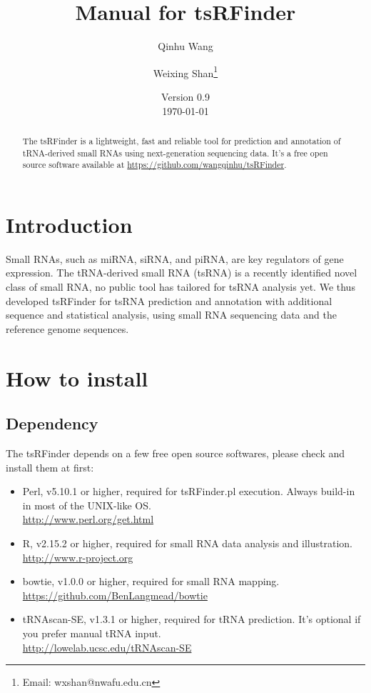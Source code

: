\documentclass[11pt, a4paper]{article}
\title{Manual for tsRFinder}
\author{Qinhu Wang}
\author{Weixing Shan\thanks{Email: wxshan@nwafu.edu.cn}}
\affil{Northwest A\&F University}
\date{Version 0.9\\[3pt] \today}
\begin{document}
\maketitle

\begin{abstract}
The tsRFinder is a lightweight, fast and reliable tool for prediction and annotation of tRNA-derived small RNAs using next-generation sequencing data. It's a free open source software available at \url{https://github.com/wangqinhu/tsRFinder}.
\end{abstract}

\clearpage

\tableofcontents

\clearpage

\section{Introduction}

Small RNAs, such as miRNA, siRNA, and piRNA, are key regulators of gene expression. The tRNA-derived small RNA (tsRNA) is a recently identified novel class of small RNA, no public tool has tailored for tsRNA analysis yet. We thus developed tsRFinder for tsRNA prediction and annotation with additional sequence and statistical analysis, using small RNA sequencing data and the reference genome sequences.

\section{How to install}

\subsection{Dependency}

The tsRFinder depends on a few free open source softwares, please check and install them at first:

\begin{itemize}

\item Perl, v5.10.1 or higher, required for tsRFinder.pl execution. Always build-in in most of the UNIX-like OS. \\\url{http://www.perl.org/get.html}
\item R, v2.15.2 or higher, required for small RNA data analysis and illustration. \\\url{http://www.r-project.org}
\item bowtie, v1.0.0 or higher, required for small RNA mapping. \\\url{https://github.com/BenLangmead/bowtie}
\item tRNAscan-SE, v1.3.1 or higher, required for tRNA prediction. It's optional if you prefer manual tRNA input. \\\url{http://lowelab.ucsc.edu/tRNAscan-SE}

\end{itemize}
\end{document}
